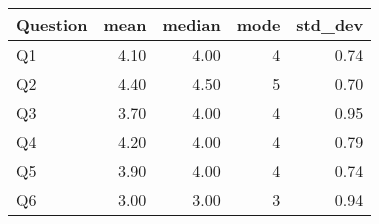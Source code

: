 \begin{tabular}{lrrrr}
\toprule
Question & mean & median & mode & std_dev \\
\midrule
Q1 & 4.10 & 4.00 & 4 & 0.74 \\
Q2 & 4.40 & 4.50 & 5 & 0.70 \\
Q3 & 3.70 & 4.00 & 4 & 0.95 \\
Q4 & 4.20 & 4.00 & 4 & 0.79 \\
Q5 & 3.90 & 4.00 & 4 & 0.74 \\
Q6 & 3.00 & 3.00 & 3 & 0.94 \\
\bottomrule
\end{tabular}
